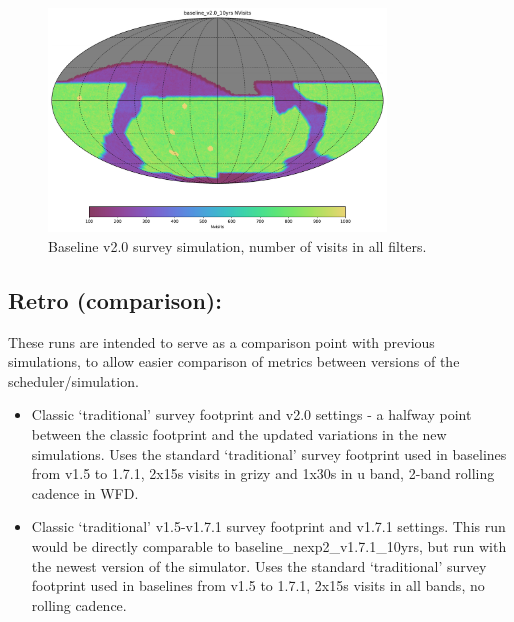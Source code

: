 \begin{figure}[htbp]
\begin{center}
\includegraphics[width=0.8\textwidth]{baseline_v2_0_10yrs_Nvisits_HEAL_SkyMap}
\caption{Baseline v2.0 survey simulation, number of visits in all filters.}
\label{fig:baseline_v2.0_footprint}
\end{center}
\end{figure}



\subsection{Retro (comparison):}
These runs are intended to serve as a comparison point with previous simulations, to allow easier comparison of metrics between versions of the scheduler/simulation.
\begin{itemize} 
\item Classic ‘traditional’ survey footprint and v2.0 settings - a halfway point between the classic footprint and the updated variations in the new simulations. Uses the standard ‘traditional’ survey footprint used in baselines from v1.5 to 1.7.1, 2x15s visits in grizy and 1x30s in u band, 2-band rolling cadence in WFD.
\item Classic ‘traditional’ v1.5-v1.7.1 survey footprint and v1.7.1 settings. This run would be directly comparable to baseline\_nexp2\_v1.7.1\_10yrs, but run with the newest version of the simulator. Uses the standard ‘traditional’ survey footprint used in baselines from v1.5 to 1.7.1, 2x15s visits in all bands, no rolling cadence.
\end{itemize}


